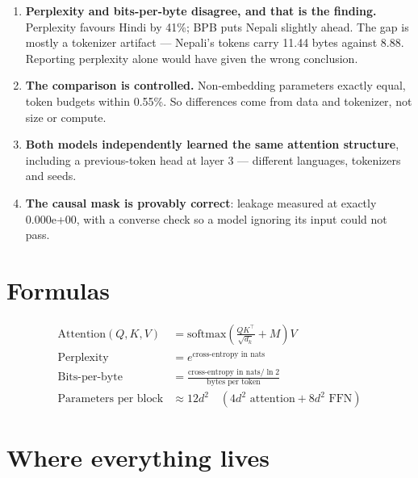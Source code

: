 \documentclass[11pt]{report}
\begin{document}
\begin{enumerate}[leftmargin=*]
\item \textbf{Perplexity and bits-per-byte disagree, and that is the finding.}
      Perplexity favours Hindi by 41\%; BPB puts Nepali slightly ahead. The gap is
      mostly a tokenizer artifact --- Nepali's tokens carry 11.44 bytes against
      8.88. Reporting perplexity alone would have given the wrong conclusion.
\item \textbf{The comparison is controlled.} Non-embedding parameters exactly
      equal, token budgets within 0.55\%. So differences come from data and
      tokenizer, not size or compute.
\item \textbf{Both models independently learned the same attention structure},
      including a previous-token head at layer 3 --- different languages,
      tokenizers and seeds.
\item \textbf{The causal mask is provably correct}: leakage measured at exactly
      0.000e+00, with a converse check so a model ignoring its input could not
      pass.
\end{enumerate}

\section{Formulas}

\begin{align*}
\text{Attention}(Q,K,V) &= \text{softmax}\!\left(\frac{QK^\top}{\sqrt{d_k}} + M\right)V \\[4pt]
\text{Perplexity} &= e^{\text{cross-entropy in nats}} \\[4pt]
\text{Bits-per-byte} &= \frac{\text{cross-entropy in nats} / \ln 2}{\text{bytes per token}} \\[4pt]
\text{Parameters per block} &\approx 12 d^2 \quad (4d^2 \text{ attention} + 8d^2 \text{ FFN})
\end{align*}

\section{Where everything lives}
\end{document}
